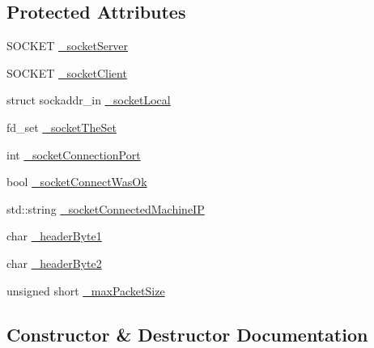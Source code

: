 \subsection*{Protected Attributes}
\begin{DoxyCompactItemize}
\item 
S\+O\+C\+K\+ET \hyperlink{classCSocketInConnection_aee8c491e5d179aa20921f38cef08ac0d}{\+\_\+socket\+Server}
\item 
S\+O\+C\+K\+ET \hyperlink{classCSocketInConnection_a56e7bb3cec18ed99eba6edbe8f80141b}{\+\_\+socket\+Client}
\item 
struct sockaddr\+\_\+in \hyperlink{classCSocketInConnection_a7fbfa7dd8415d8cd50ddc3062bc2c1c8}{\+\_\+socket\+Local}
\item 
fd\+\_\+set \hyperlink{classCSocketInConnection_a0d6c6fbb3215d3ba3332fca268802d44}{\+\_\+socket\+The\+Set}
\item 
int \hyperlink{classCSocketInConnection_a4a51213ec51b9d4e51c7006828f988fb}{\+\_\+socket\+Connection\+Port}
\item 
bool \hyperlink{classCSocketInConnection_a01ce97069b2749c8921bc2f043086de1}{\+\_\+socket\+Connect\+Was\+Ok}
\item 
std\+::string \hyperlink{classCSocketInConnection_a038af4cdb71b67aa89d459783c03da45}{\+\_\+socket\+Connected\+Machine\+IP}
\item 
char \hyperlink{classCSocketInConnection_a29aaed85ddeae77c458e55a525913f92}{\+\_\+header\+Byte1}
\item 
char \hyperlink{classCSocketInConnection_aba9547facc04cc1229bcf4180665a245}{\+\_\+header\+Byte2}
\item 
unsigned short \hyperlink{classCSocketInConnection_a7b957c558cb8fe7bbc0d38e7eb935fdd}{\+\_\+max\+Packet\+Size}
\end{DoxyCompactItemize}


\subsection{Constructor \& Destructor Documentation}
